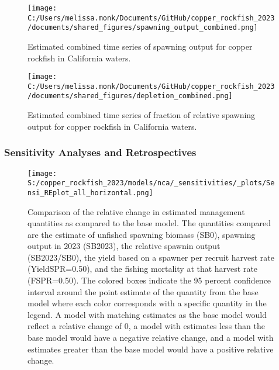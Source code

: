 \documentclass[11pt,
  english,
  letterpaper,
]{article}
\begin{document}
\pagebreak

\begin{figure}
\centering
\texttt{[image: C:/Users/melissa.monk/Documents/GitHub/copper\_rockfish\_2023/documents/shared\_figures/spawning\_output\_combined.png]}
\caption{Estimated combined time series of spawning output for copper rockfish in California waters.\label{fig:sb-all}}
\end{figure}

\clearpage

\begin{figure}
\centering
\texttt{[image: C:/Users/melissa.monk/Documents/GitHub/copper\_rockfish\_2023/documents/shared\_figures/depletion\_combined.png]}
\caption{Estimated combined time series of fraction of relative spawning output for copper rockfish in California waters.\label{fig:depl-all}}
\end{figure}

\clearpage

\hypertarget{sensitivity-analyses-and-retrospectives}{%
\subsubsection{Sensitivity Analyses and Retrospectives}\label{sensitivity-analyses-and-retrospectives}}

\begin{figure}
\centering
\texttt{[image: S:/copper\_rockfish\_2023/models/nca/\_sensitivities/\_plots/Sensi\_REplot\_all\_horizontal.png]}
\caption{Comparison of the relative change in estimated management quantities as compared to the base model. The quantities compared are the estimate of unfished spawning biomass (SB0), spawning output in 2023 (SB2023), the relative spawnin output (SB2023/SB0), the yield based on a spawner per recruit harvest rate (YieldSPR=0.50), and the fishing mortality at that harvest rate (FSPR=0.50). The colored boxes indicate the 95 percent confidence interval around the point estimate of the quantity from the base model where each color corresponds with a specific quantity in the legend. A model with matching estimates as the base model would reflect a relative change of 0, a model with estimates less than the base model would have a negative relative change, and a model with estimates greater than the base model would have a positive relative change.\label{fig:sens-all}}
\end{figure}
\end{document}
